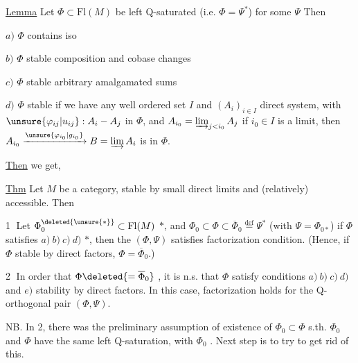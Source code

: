 \uline{Lemma} Let $\Phi\subset\mathrm{Fl}(M)$ be left Q-saturated (i.e. $\Phi=\Psi^*$) for some $\Psi$
Then 

$a)$ $\Phi$ contains iso

$b)$ $\Phi$ stable   composition and cobase changes

$c)$ $\Phi$ stable   arbitrary amalgamated sums 

$d)$ $\Phi$ stable 
if we have any well ordered set $I$ and $(A_i)_{i\in I}$ direct system, with $\unsure{\varphi_{ij}|u_{ij}}:A_i-A_j$ in $\Phi$, and $A_{i_0}=\varinjlim_{j<i_0}A_j$ if $i_0\in I$ is a limit,
then  $A_{i_0}\xrightarrow{\unsure{\varphi_{i_0}|g_{i_0}}}B=\varinjlim A_i$ is in $\Phi$.

\uline{Then} we get,

\uline{Thm} Let $M$ be a category, stable by small direct limits and (relatively) accessible. Then

\textcircled{1}  Let $\Phi_0^{\deleted{\unsure{*}}}\subset\mathrm{Fl}(M)$ $*$, and $\Phi_0\subset\Phi\subset\overline\Phi_0\stackrel{\mathrm{def}}=\Psi^*$ (with $\Psi=\Phi_{0*}$)
if $\Phi$  satisfies $a)\ b)\ c)\ d)$ $*$, then the $(\Phi,\Psi)$ satisfies factorization condition. (Hence, if $\Phi$ stable by direct factors, $\Phi=\overline\Phi_0$.)

\textcircled{2}  In order that $\Phi\deleted{=\overline\Phi_0}$ , it is n.s. that $\Phi$ satisfy conditions $a)\ b)\ c)\ d)$ and $e)$ stability by direct factors. In this case, factorization holds for the Q-orthogonal pair $(\Phi,\Psi)$.

NB. In 2,  there was the preliminary assumption of existence of $\Phi_0\subset\Phi$ s.th. $\Phi_0$ and $\Phi$ have the same left Q-saturation, with $\Phi_0$ . Next step is to try to get rid of this.

